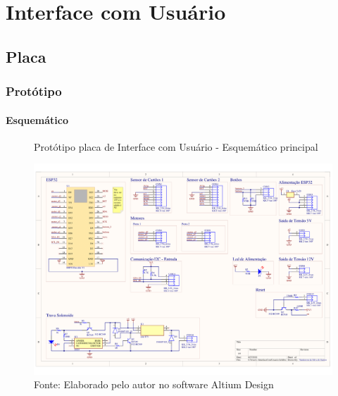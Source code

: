 \documentclass[../delivery_hospital_report.tex]{subfiles}
\begin{document}
\section{Interface com Usuário}
\subsection{Placa}

\subsubsection{Protótipo}

\paragraph{Esquemático}

\begin{figure}[h]
\centering
    \caption{Protótipo placa de Interface com Usuário - Esquemático principal }
    \centering %
    \includegraphics[width=17cm]{modulos/InterfaceComUsuario-1.png}
    \caption*{Fonte: Elaborado pelo autor no software Altium Design\cite{altium21} }
    \label{Protótipo placa de ## - Esquemático principal}
\end{figure}
\end{document}
